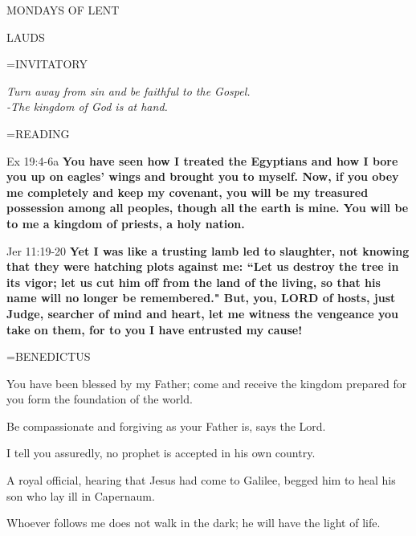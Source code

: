 \begin{center}\normalsize MONDAYS OF LENT\\
\end{center}

\begin{flushleft}\normalsize LAUDS\\\end{flushleft}

\hangindent=\parindent \small{INVITATORY}
\begin{center}
\textit{Turn away from sin and be faithful to the Gospel.\\}
\textit{-The kingdom of God is at hand.\\}
\end{center}

\hangindent=\parindent \small READING
\begin{description}[labelindent=\parindent, leftmargin=*]
\item [Week 1-4:]   Ex 19:4-6a \textbf{  You have seen how I treated the Egyptians and how I bore you up on eagles’ wings and brought you to myself. Now, if you obey me completely and keep my covenant, you will be my treasured possession among all peoples, though all the earth is mine. You will be to me a kingdom of priests, a holy nation.\\}
\item [Week 5:]   Jer 11:19-20 \textbf{  Yet I was like a trusting lamb led to slaughter, not knowing that they were hatching plots against me: “Let us destroy the tree in its vigor; let us cut him off from the land of the living, so that his name will no longer be remembered." But, you, LORD of hosts, just Judge, searcher of mind and heart, let me witness the vengeance you take on them, for to you I have entrusted my cause!\\}
\end{description}

\hangindent=\parindent \small BENEDICTUS
\begin{description}[labelindent=\parindent, leftmargin=*]
\item [Week 1:] 	You have been blessed by my Father; come and receive the kingdom prepared for you form the foundation of the world.
\item [Week 2:] 	Be compassionate and forgiving as your Father is, says the Lord.
\item [Week 3:] 	I tell you assuredly, no prophet is accepted in his own country.
\item [Week 4:] 	A royal official, hearing that Jesus had come to Galilee, begged him to heal his son who lay ill in Capernaum.
\item [Week 5:] 	Whoever follows me does not walk in the dark; he will have the light of life.
\end{description}

